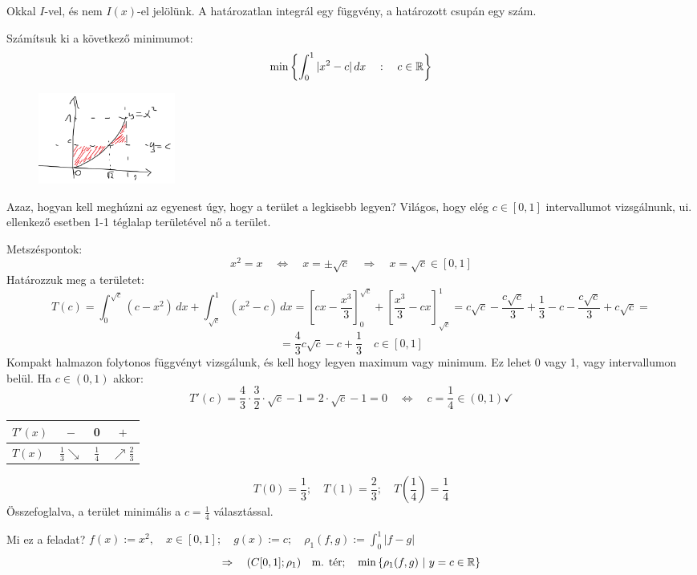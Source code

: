 \documentclass[a4paper,11.5pt]{article}
\begin{document}
	\begin{note}
		Okkal $I$-vel, és nem $I(x)$-el jelölünk. A határozatlan integrál egy függvény, a határozott csupán egy szám.
	\end{note}
	\begin{example}
		Számítsuk ki a következő minimumot:
		\[ \min\left\{\int _0^1|x^2-c|\,dx\quad :\quad c\in\mathbb{R} \right\} \]
		\begin{figure}[H]
			\centering
			\includegraphics[height=3cm]{../2zh/kepek/10.png}
			\caption{}
		\end{figure}
		
		Azaz, hogyan kell meghúzni az egyenest úgy, hogy a terület a legkisebb legyen? Világos, hogy elég $c\in[0,1]$ intervallumot vizsgálnunk, ui. ellenkező esetben 1-1 téglalap területével nő a terület.
		\smallskip
		
		Metszéspontok:
		\[ x^2=x\quad \Leftrightarrow\quad x=\pm\sqrt{c}\quad \Rightarrow\quad x=\sqrt{c}\in[0,1] \]
		Határozzuk meg a területet:
		\[ T(c)=\int_0^{\sqrt{c}}(c-x^2)\,dx+\int_{\sqrt{c}}^{1}(x^2-c)\,dx=\left[cx-\frac{x^3}{3}\right]_0^{\sqrt{c}}+\left[\frac{x^3}{3}-cx\right]^1_{\sqrt{c}}=c\sqrt{c}-\frac{c\sqrt{c}}{3}+\frac{1}{3}-c-\frac{c\sqrt{c}}{3}+c\sqrt{c}=\]
		\[=\frac{4}{3}c\sqrt{c}-c+\frac{1}{3}\quad c\in[0,1] \]
		Kompakt halmazon folytonos függvényt vizsgálunk, és kell hogy legyen maximum vagy minimum. Ez lehet 0 vagy 1, vagy intervallumon belül. Ha $c\in(0,1)$ akkor:
		\[T'(c)=\frac{4}{3}\cdot\frac{3}{2}\cdot\sqrt{c}-1=2\cdot\sqrt{c}-1=0\quad \Leftrightarrow\quad c=\frac{1}{4}\in(0,1)\checkmark \]
		\begin{center}		
			\begin{tabular}{l|c|c|c}
				$T'(x)$&$-$&0&$+$\\
				\hline
				$T(x)$&$\frac{1}{3}\searrow$&$\frac{1}{4}$&$\nearrow\frac{2}{3}$
			\end{tabular}
		\end{center}
		\[ T(0)=\frac{1}{3};\quad T(1)=\frac{2}{3};\quad T\left(\frac{1}{4}\right)=\frac{1}{4} \]
		Összefoglalva, a terület minimális a $c=\frac{1}{4}$ választással.
	\end{example}
	\begin{note}
		Mi ez a feladat? $f(x):=x^2, \quad x\in[0,1];\quad g(x):=c;\quad \rho_1(f,g):=\int_0^1|f-g|$
		\[ \Rightarrow\quad (C[0,1];\rho_1) \quad \text{m. tér};\quad \min\left\{\rho_1(f,g)\ | \ y=c\in\R\right\} \]
	\end{note}
\end{document}
